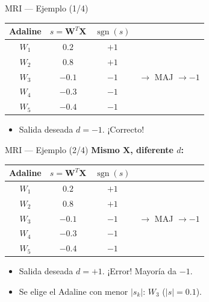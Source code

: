 \documentclass[aspectratio=169,utf8,spanish]{beamer}
\DeclareMathOperator{\sgn}{sgn}
\begin{document}
\begin{frame}{MRI — Ejemplo (1/4)}
  \begin{center}
    \begin{tabular}{c|c|c|c}
      Adaline & $s = \mathbf{W}^T\mathbf{X}$ & $\sgn(s)$ & \\
      \hline
      $W_1$ & $0.2$ & $+1$ & \\
      $W_2$ & $0.8$ & $+1$ & \\
      $W_3$ & $-0.1$ & $-1$ & $\to$ MAJ $\to -1$ \\
      $W_4$ & $-0.3$ & $-1$ & \\
      $W_5$ & $-0.4$ & $-1$ & \\
    \end{tabular}
  \end{center}
  \begin{itemize}
    \item Salida deseada $d = -1$. ¡Correcto!
  \end{itemize}
\end{frame}

\begin{frame}{MRI — Ejemplo (2/4)}
  \textbf{Mismo $\mathbf{X}$, diferente $d$:}
  \begin{center}
    \begin{tabular}{c|c|c|c}
      Adaline & $s = \mathbf{W}^T\mathbf{X}$ & $\sgn(s)$ & \\
      \hline
      $W_1$ & $0.2$ & $+1$ & \\
      $W_2$ & $0.8$ & $+1$ & \\
      $W_3$ & $-0.1$ & $-1$ & $\to$ MAJ $\to -1$ \\
      $W_4$ & $-0.3$ & $-1$ & \\
      $W_5$ & $-0.4$ & $-1$ & \\
    \end{tabular}
  \end{center}
  \begin{itemize}
    \item Salida deseada $d = +1$. ¡Error! Mayoría da $-1$.
    \item Se elige el Adaline con menor $|s_k|$: $W_3$ ($|s|=0.1$).
  \end{itemize}
\end{frame}
\end{document}
